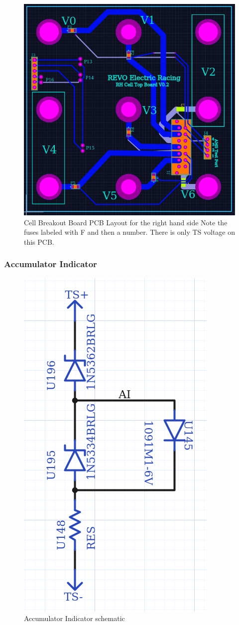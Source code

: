 \documentclass{article}
\begin{document}
              \begin{figure}[H]
                  \centering
                  \includegraphics[width = 0.4 \textwidth]{CellTopRH}
                  \caption{Cell Breakout Board PCB Layout for the right hand side Note the fuses labeled with F and then a number. There is only TS voltage on this PCB.}
                  \label{celltopRH}
              \end{figure}

         \subsubsection{Accumulator Indicator} \label{aindicator}


              \begin{figure}[H]
                  \centering
                  \includegraphics[width = 0.3 \textwidth]{aischem}
                  \caption{Accumulator Indicator schematic}
                  \label{aischem}
              \end{figure}
\end{document}
